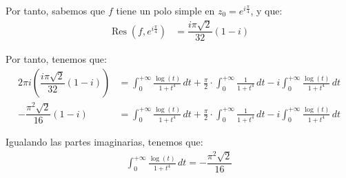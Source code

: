 \documentclass[12pt]{article}
\DeclareMathOperator{\Res}{Res}
\begin{document}
\begin{ejercicio}[2.5 puntos]
    Por tanto, sabemos que $f$ tiene un polo simple en $z_0 = e^{i\frac{\pi}{4}}$, y que:
    \begin{align*}
        \Res\left(f, e^{i\frac{\pi}{4}}\right) &= \dfrac{i\pi\sqrt{2}}{32}(1-i)
    \end{align*}

    Por tanto, tenemos que:
    \begin{align*}
        2\pi i\left(\dfrac{i\pi\sqrt{2}}{32}(1-i)\right) &= \int_0^{+\infty} \frac{\log(t)}{1 + t^4} \, dt + \frac{\pi}{2}\cdot \int_{0}^{+\infty} \frac{1}{1 + t^4} \, dt - i\int_0^{+\infty} \frac{\log(t)}{1 + t^4} \, dt\\
        -\dfrac{\pi^2\sqrt{2}}{16}(1-i) &= \int_0^{+\infty} \frac{\log(t)}{1 + t^4} \, dt + \frac{\pi}{2}\cdot \int_{0}^{+\infty} \frac{1}{1 + t^4} \, dt - i\int_0^{+\infty} \frac{\log(t)}{1 + t^4} \, dt
    \end{align*}

    Igualando las partes imaginarias, tenemos que:
    \begin{align*}
        \int_0^{+\infty} \frac{\log(t)}{1 + t^4} \, dt
        = -\dfrac{\pi^2\sqrt{2}}{16}
    \end{align*}
    \end{ejercicio}
\end{document}
